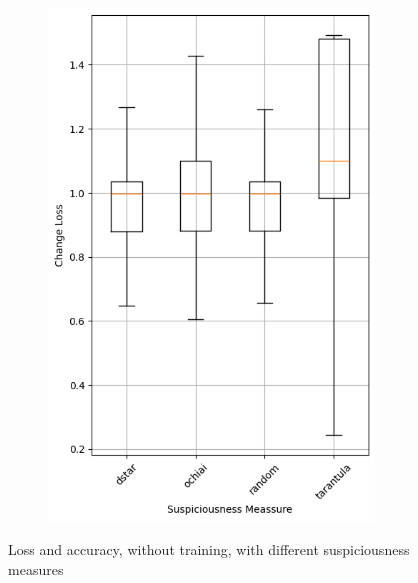 \begin{figure}
\begin{subfigure}{0.5\textwidth}
        \includegraphics[width=0.95\textwidth]{plots/Meassure_NotTrained_loss.png}
    \end{subfigure}
    \caption{Loss and accuracy, without training, with different suspiciousness measures}
    \label{fig:suspiciousness-measures-notraining}
\end{figure}
